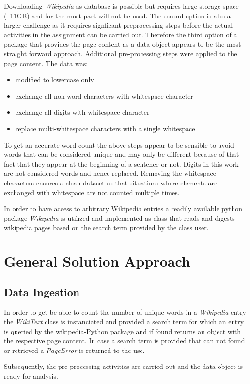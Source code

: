 \documentclass[11pt]{article}
\begin{document}
Downloading \emph{Wikipedia} as database is possible but requires large storage space (~11GB) and for the most part will not be used. The second option is also a larger challenge as it requires signficant preprocessing steps before the actual activities in the assignment can be carried out. Therefore the third option of a package that provides the page content as a data object appears to be the most straight forward approach. Additional pre-processing steps were applied to the page content. The data was:
\begin{itemize}
\item modified to lowercase only
\item exchange all non-word characters with whitespace character
\item exchange all digits with whitespace character
\item replace multi-whitespace characters with a single whitespace
\end{itemize}
To get an accurate word count the above steps appear to be sensible to avoid words that can be considered unique and may only be different because of that fact that they appear at the beginning of a sentence or not. Digits in this work are not considered words and hence replaced. Removing the whitespace characters ensures a clean dataset so that situations where elements are exchanged with whitespace are not counted multiple times.

In order to have access to arbitrary Wikipedia entries a readily available python package \emph{Wikipedia} is utilized and implemented as class that reads and digests wikipedia pages based on the search term provided by the class user.


\section{General Solution Approach}
\subsection{Data Ingestion}
In order to get be able to count the number of unique words in a \emph{Wikipedia} entry the \emph{WikiText} class is instanciated and provided a search term for which an entry is queried by the wikipedia-Python package and if found returns an object with the respective page content. In case a search term is provided that can not found or retrieved a \emph{PageError} is returned to the use.

Subsequently, the pre-processing activities are carried out and the data object is ready for analysis.
\end{document}
